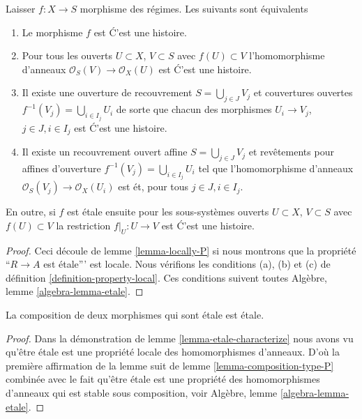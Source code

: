 \begin{lemma}

\label{lemma-etale-characterize}

Laisser $f : X \to S$ morphisme des régimes. Les suivants sont équivalents

\begin{enumerate}

\item Le morphisme $f$ est \'C'est une histoire.
\item Pour tous les ouverts $U \subset X$, $V \subset S$
avec $f(U) \subset V$ l'homomorphisme d'anneaux
$\mathcal{O}_S(V) \to \mathcal{O}_X(U)$ est \'C'est une histoire.
\item Il existe une ouverture de recouvrement $S = \bigcup_{j \in J} V_j$
et couvertures ouvertes $f^{-1}(V_j) = \bigcup_{i \in I_j} U_i$ de sorte que chacun des morphismes $U_i \to V_j$, $j\in J, i\in I_j$
est \'C'est une histoire.
\item Il existe un recouvrement ouvert affine $S = \bigcup_{j \in J} V_j$
et revêtements pour affines d'ouverture $f^{-1}(V_j) = \bigcup_{i \in I_j} U_i$ tel que l'homomorphisme d'anneaux $\mathcal{O}_S(V_j) \to \mathcal{O}_X(U_i)$ est
\'et, pour tous $j\in J, i\in I_j$.

\end{enumerate}

En outre, si $f$ est \'etale ensuite pour les sous-systèmes ouverts $U \subset X$, $V \subset S$ avec $f(U) \subset V$
la restriction $f|_U : U \to V$ est \'C'est une histoire.

\end{lemma}

\begin{proof}
Ceci découle de lemme \ref{lemma-locally-P} si nous montrons que la propriété ``$R \to A$ est \'etale''' est locale. Nous vérifions les conditions (a), (b) et (c) de définition \ref{definition-property-local}. Ces conditions suivent toutes Algèbre, lemme \ref{algebra-lemma-etale}.
\end{proof}

\begin{lemma}

\label{lemma-composition-etale}
La composition de deux morphismes qui sont \'etale est \'etale.
\end{lemma}

\begin{proof}
Dans la démonstration de lemme \ref{lemma-etale-characterize} nous avons vu qu'être \'etale est une propriété locale des homomorphismes d'anneaux. D'où la première affirmation de la lemme suit de lemme \ref{lemma-composition-type-P} combinée avec le fait qu'être \'etale est une propriété des homomorphismes d'anneaux qui est stable sous composition, voir Algèbre, lemme \ref{algebra-lemma-etale}.
\end{proof}

